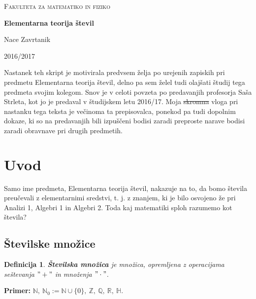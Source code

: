 \documentclass[12pt, a4paper]{article}
\newtheorem{defi}{Definicija}
\newenvironment{prim}[1][]{\par\medskip\noindent \textbf{Primer: }}{\medskip}
\begin{document}
\begin{titlepage}
	\centering
	
	{\scshape\Large Fakulteta za matematiko in fiziko \par}
	\vspace{2cm}

	{\Huge\bfseries Elementarna teorija števil\par}
	\vspace{2cm}
	{\Large Nace Zavrtanik\par}
	
	\vfill

	{\large 2016/2017\par}
\end{titlepage}
\noindent Nastanek teh skript je motivirala predvsem želja po urejenih zapiskih pri predmetu Elementarna teorija števil, delno pa sem želel tudi olajšati študij tega predmeta svojim kolegom. Snov je v celoti povzeta po predavanjih profesorja Saša Strleta, kot jo je predaval v študijskem letu 2016/17. Moja \sout{skromna} vloga pri nastanku tega teksta je večinoma ta prepisovalca, ponekod pa tudi dopolnim dokaze, ki so na predavanjih bili izpuščeni bodisi zaradi preproste narave bodisi zaradi obravnave pri drugih predmetih.
\newpage

	\tableofcontents
	\newpage

\section{Uvod}

Samo ime predmeta, Elementarna teorija števil, nakazuje na to, da bomo števila preučevali z elementarnimi sredstvi, t. j. z znanjem, ki je bilo osvojeno že pri Analizi 1, Algebri 1 in Algebri 2. Toda kaj matematiki sploh razumemo kot števila?

\subsection{Številske množice}

\begin{defi}
\textbf{Številska množica} je množica, opremljena z operacijama seštevanja $"+"$ in množenja $"\cdot "$.
\end{defi}

\begin{prim}
 $\mathbb{N},\ \mathbb{N}_{0}:=\mathbb{N} \cup \{ 0 \},\ \mathbb{Z} ,\ \mathbb{Q} ,\ \mathbb{R} ,\ \mathbb{H}.$
\end{prim}
\end{document}
